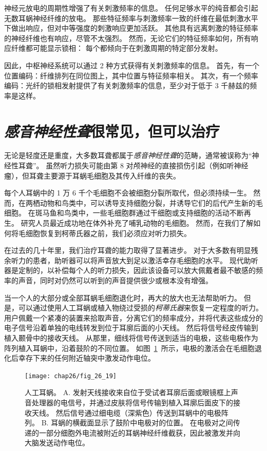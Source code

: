 神经元放电的周期性增强了有关刺激频率的信息。
任何足够水平的纯音都会引起无数耳蜗神经纤维的放电。
那些特征频率与刺激频率一致的纤维在最低刺激水平下做出响应，但对中等强度的刺激响应更加活跃。
其他具有远离刺激的特征频率的神经纤维也有响应，尽管不太强烈。
然而，无论它们的特征频率如何，所有响应纤维都可能显示锁相：
每个都倾向于在刺激周期的特定部分发射。


因此，中枢神经系统可以通过 2 种方式获得有关刺激频率的信息。
首先，有一个位置编码：纤维排列在同位图上，其中位置与特征频率相关。
其次，有一个频率编码：光纤的锁相发射提供了有关刺激频率的信息，至少对于低于 3 千赫兹的频率是这样。



\section{\textit{感音神经性聋}很常见，但可以治疗}

无论是轻度还是重度，大多数耳聋都属于\textit{感音神经性聋}的范畴，通常被误称为“神经性耳聋”。
虽然听力损失可能由第 8 对颅神经的直接损伤引起（例如听神经瘤），但耳聋主要源于耳蜗毛细胞及其传入纤维的丧失。


每个人耳蜗中的 1 万 6 千个毛细胞不会被细胞分裂所取代，但必须持续一生。
然而，在两栖动物和鸟类中，可以诱导支持细胞分裂，并诱导它们的后代产生新的毛细胞。
在斑马鱼和鸟类中，一些毛细胞群通过干细胞或支持细胞的活动不断再生。
研究人员最近成功地在体外补充了哺乳动物的毛细胞。
然而，在我们了解如何将毛细胞恢复到柯蒂氏器之前，我们必须应对听力损失。


在过去的几十年里，我们治疗耳聋的能力取得了显著进步。
对于大多数有明显残余听力的患者，助听器可以将声音放大到足以激活幸存毛细胞的水平。
现代助听器是定制的，以补偿每个人的听力损失，因此该设备可以放大佩戴者最不敏感的频率的声音，同时对仍然可以听到的声音提供很少或根本没有增强。


当一个人的大部分或全部耳蜗毛细胞退化时，再大的放大也无法帮助听力。
但是，可以通过使用人工耳蜗或植入物绕过受损的\textit{柯蒂氏器}来恢复一定程度的听力。
用户佩戴一个紧凑的装置来拾取声音，分离它们的频率成分，并将代表这些成分的电子信号沿着单独的电线转发到位于耳廓后面的小天线。
然后将信号经皮传输到植入颞骨中的接收天线。
从那里，细线将信号传送到适当的电极，这些电极作为阵列植入耳蜗中，沿着鼓阶的不同位置。
如图~\ref{fig:26_19}~所示，电极的激活会在毛细胞退化后幸存下来的任何附近轴突中激发动作电位。


\begin{figure}[htbp]
	\centering
	\texttt{[image: chap26/fig\_26\_19]}
	\caption{人工耳蜗。
		A. 发射天线接收来自位于受试者耳廓后面或眼镜框上声音处理器的电信号，并通过皮肤将信号传输到植入耳廓后面皮下的接收天线。
		然后信号通过细电缆（深紫色）传送到耳蜗中的电极阵列。
		B. 耳蜗的横截面显示了鼓阶中电极对的位置。
		在电极对之间传递的一部分细胞外电流被附近的耳蜗神经纤维截获，因此被激发并向大脑发送动作电位。}
	\label{fig:26_19}
\end{figure}


